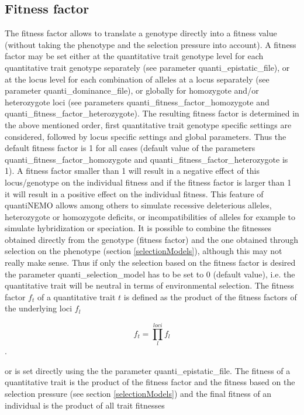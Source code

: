 \documentclass[letterpaper,12pt,oneside]{book}
\begin{document}
\subsection{Fitness factor}\label{fitnessFactor}
The fitness factor allows to translate a genotype directly into a fitness value (without taking the
phenotype and the selection pressure into account). A fitness factor may be set either at the
quantitative trait genotype level for each quantitative trait genotype separately (see parameter
\textsf{quanti\_epistatic\_file}), or at the locus level for each combination of alleles at a locus
separately (see parameter \textsf{quanti\_dominance\_file}), or globally for homozygote and/or
heterozygote loci (see parameters \textsf{quanti\_fitness\_factor\_homozygote} and
\textsf{quanti\_fitness\_factor\_heterozygote}). The resulting fitness factor is determined in the
above mentioned order, first quantitative trait genotype specific settings are considered, followed
by locus specific settings and global parameters. Thus the default fitness factor is 1 for all cases
(default value of the parameters \textsf{quanti\_fitness\_factor\_homozygote} and
\textsf{quanti\_fitness\_factor\_heterozygote} is 1). A fitness factor smaller than 1 will result in
a negative effect of this locus/genotype on the individual fitness and if the fitness factor is
larger than 1 it will result in a positive effect on the individual fitness. This feature of
quantiNEMO allows among others to simulate recessive deleterious alleles, heterozygote or homozygote
deficits, or incompatibilities of alleles for example to simulate hybridization or speciation. It is
possible to combine the fitnesses obtained directly from the genotype (fitness factor) and the one
obtained through selection on the phenotype (section \ref{selectionModels}), although this may not
really make sense. Thus if only the selection based on the fitness factor is desired the parameter
\textsf{quanti\_selection\_model} has to be set to 0 (default value), i.e. the quantitative trait will be neutral in terms of environmental selection. The fitness factor $f_{t}$ of a quantitative trait $t$ is defined as the product of the fitness factors of the underlying loci $f_{l}$

	\[f_{t} = \prod_{l}^{loci}f_{l}\].
	
or is set directly using the the parameter \textsf{quanti\_epistatic\_file}. The fitness of a quantitative trait is the product of the fitness factor and the fitness based on the selection pressure (see section \ref{selectionModels}) and the final fitness of an individual is the product of all trait fitnesses 
\end{document}

